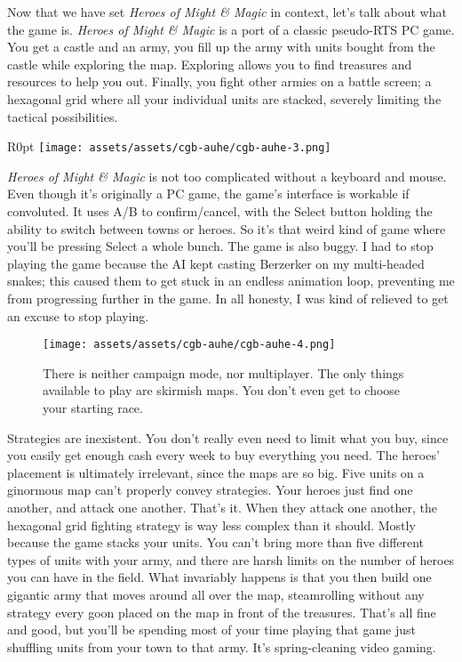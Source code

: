 \documentclass{book}
\begin{document}
Now that we have set \emph{Heroes of Might \& Magic} in context, let’s talk about what the game is. \emph{Heroes of Might \& Magic} is a port of a classic pseudo-RTS PC game. You get a castle and an army, you fill up the army with units bought from the castle while exploring the map. Exploring allows you to find treasures and resources to help you out. Finally, you fight other armies on a battle screen; a hexagonal grid where all your individual units are stacked, severely limiting the tactical possibilities.

\begin{wrapfigure}{R}{0pt} \texttt{[image: assets/assets/cgb-auhe/cgb-auhe-3.png]}\end{wrapfigure}
\emph{Heroes of Might \& Magic} is not too complicated without a keyboard and mouse. Even though it’s originally a PC game, the game’s interface is workable if convoluted. It uses A/B to confirm/cancel, with the Select button holding the ability to switch between towns or heroes. So it’s that weird kind of game where you’ll be pressing Select a whole bunch. The game is also buggy. I had to stop playing the game because the AI kept casting Berzerker on my multi-headed snakes; this caused them to get stuck in an endless animation loop, preventing me from progressing further in the game. In all honesty, I was kind of relieved to get an excuse to stop playing.

\begin{figure}[hbt]
\vskip 10pt
\centering \texttt{[image: assets/assets/cgb-auhe/cgb-auhe-4.png]}\par\pagetwodescription There is neither campaign mode, nor multiplayer. The only things available to play are skirmish maps. You don’t even get to choose your starting race.
\vskip 6pt
\end{figure}

Strategies are inexistent. You don’t really even need to limit what you buy, since you easily get enough cash every week to buy everything you need. The heroes’ placement is ultimately irrelevant, since the maps are so big. Five units on a ginormous map can’t properly convey strategies. Your heroes just find one another, and attack one another. That’s it. When they attack one another, the hexagonal grid fighting strategy is way less complex than it should. Mostly because the game stacks your units. You can’t bring more than five different types of units with your army, and there are harsh limits on the number of heroes you can have in the field. What invariably happens is that you then build one gigantic army that moves around all over the map, steamrolling without any strategy every goon placed on the map in front of the treasures. That’s all fine and good, but you’ll be spending most of your time playing that game just shuffling units from your town to that army. It’s spring-cleaning video gaming.
\end{document}
